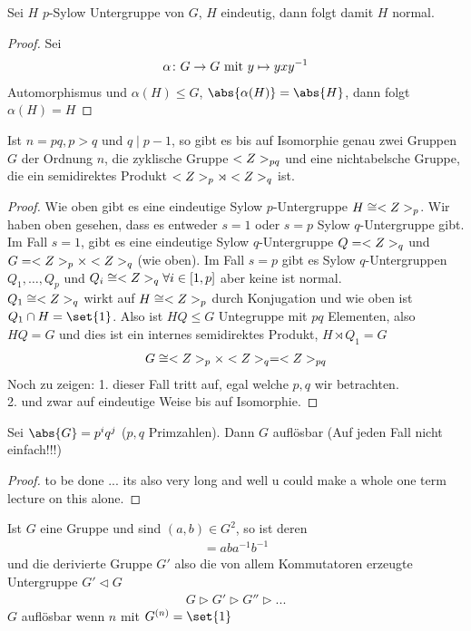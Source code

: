 \begin{proposition}
	Sei $H$ $p$-Sylow Untergruppe von $G$, $H$ eindeutig, dann folgt damit $H$ normal.
\end{proposition}
\begin{proof}
		Sei
	\begin{align*}
	\alpha \colon G \to G \mit y \mapsto y x y^{-1}
	\end{align*}
	Automorphismus und $\alpha(H) \le G$, $\abs{\alpha(H)} = \abs{H}$, dann folgt $\alpha(H) = H$
\end{proof}
\begin{proposition}
	Ist $n = pq, p>q$ und $q \mid p-1$, so gibt es bis auf Isomorphie genau zwei Gruppen $G$ der Ordnung $n$, die zyklische Gruppe $\Z_{pq}$ und eine nichtabelsche Gruppe, die ein semidirektes Produkt $\Z_p \rtimes\Z_q$ ist.
\end{proposition}
\begin{proof}
	Wie oben gibt es eine eindeutige Sylow $p$-Untergruppe $H \cong \Z_p$. Wir haben oben gesehen, dass es entweder $s=1$ oder $s = p$ Sylow $q$-Untergruppe gibt. Im Fall $s=1$, gibt es eine eindeutige Sylow $q$-Untergruppe $Q = \Z_q$ und $G = \Z_p \times \Z_q$ (wie oben). Im Fall $s=p$ gibt es Sylow $q$-Untergruppen $Q_1, \dots, Q_p$ und $Q_i \cong \Z_q \forall i \in [1,p]$ aber keine ist normal.\\
	$Q_1 \cong \Z_q$ wirkt auf $H \cong \Z_p$ durch Konjugation und wie oben ist $Q_1 \cap H = \set{1}$. Also ist $HQ \le G$ Untegruppe mit $pq$ Elementen, also $HQ = G$ und dies ist ein internes semidirektes Produkt, $H \rtimes Q_1 = G$
	\begin{align*}
		G \cong \Z_p \times \Z_q = \Z_{pq}
	\end{align*}
	Noch zu zeigen: 1. dieser Fall tritt auf, egal welche $p,q$ wir betrachten.\\
	2. und zwar auf eindeutige Weise bis auf Isomorphie.
\end{proof}
\begin{proposition}
	Sei $\abs{G} = p^i q^j$ ($p,q$ Primzahlen). Dann $G$ auflösbar (Auf jeden Fall nicht einfach!!!)
\end{proposition}
\begin{proof}
	to be done ... its also very long and well u could make a whole one term lecture on this alone.
\end{proof}
\begin{definition}
	Ist $G$ eine Gruppe und sind $(a,b) \in G^2$, so ist deren 
	\begin{align*}
		[a,b] = aba^{-1}b^{-1}
	\end{align*}
	und die derivierte Gruppe $G'$ also die von allem Kommutatoren erzeugte Untergruppe $G' \lhd G$
	\begin{align*}
		G \rhd G' \rhd G'' \rhd ...
	\end{align*}
	$G$ auflösbar wenn $n$ mit $G^{(n)} = \set{1}$
\end{definition}
